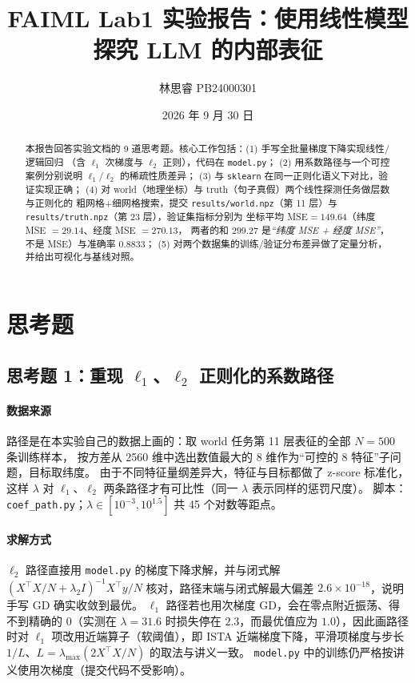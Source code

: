 \documentclass[UTF8,a4paper]{ctexart}
\title{FAIML Lab1 实验报告：使用线性模型探究 LLM 的内部表征}
\author{林思睿 PB24000301}
\date{2026 年 9 月 30 日}
\begin{document}
\maketitle

\begin{abstract}
本报告回答实验文档的 9 道思考题。核心工作包括：(1) 手写全批量梯度下降实现线性/逻辑回归
（含 $\ell_1$ 次梯度与 $\ell_2$ 正则），代码在 \texttt{model.py}；
(2) 用系数路径与一个可控案例分别说明 $\ell_1$/$\ell_2$ 的稀疏性质差异；
(3) 与 \texttt{sklearn} 在同一正则化语义下对比，验证实现正确；
(4) 对 world（地理坐标）与 truth（句子真假）两个线性探测任务做层数与正则化的
粗网格+细网格搜索，提交 \texttt{results/world.npz}（第 11 层）与
\texttt{results/truth.npz}（第 23 层），验证集指标分别为
坐标平均 MSE$=149.64$（纬度 MSE $=29.14$、经度 MSE $=270.13$，
两者的和 $299.27$ 是\emph{“纬度 MSE + 经度 MSE”}，不是 MSE）与准确率 $0.8833$；
(5) 对两个数据集的训练/验证分布差异做了定量分析，并给出可视化与基线对照。
\end{abstract}

\tableofcontents

\section{思考题}

\subsection{思考题 1：重现 $\ell_1$、$\ell_2$ 正则化的系数路径}

\paragraph{数据来源}
路径是在本实验自己的数据上画的：取 world 任务第 11 层表征的全部 $N=500$ 条训练样本，
按方差从 2560 维中选出数值最大的 8 维作为“可控的 8 特征”子问题，目标取纬度。
由于不同特征量纲差异大，特征与目标都做了 z-score 标准化，这样 $\lambda$ 对
$\ell_1$、$\ell_2$ 两条路径才有可比性（同一 $\lambda$ 表示同样的惩罚尺度）。
脚本：\texttt{coef\_path.py}；$\lambda\in[10^{-3},10^{1.5}]$ 共 45 个对数等距点。

\paragraph{求解方式}
$\ell_2$ 路径直接用 \texttt{model.py} 的梯度下降求解，并与闭式解
$(X^\top X/N+\lambda_2 I)^{-1}X^\top y/N$ 核对，路径末端与闭式解最大偏差
$2.6\times10^{-18}$，说明手写 GD 确实收敛到最优。
$\ell_1$ 路径若也用次梯度 GD，会在零点附近振荡、得不到精确的 $0$（实测在
$\lambda=31.6$ 时损失停在 $2.3$，而最优值应为 $1.0$），因此画路径时对 $\ell_1$
项改用近端算子（软阈值），即 ISTA 近端梯度下降，平滑项梯度与步长
$1/L$、$L=\lambda_{\max}(2X^\top X/N)$ 的取法与讲义一致。
\texttt{model.py} 中的训练仍严格按讲义使用次梯度（提交代码不受影响）。
\end{document}
